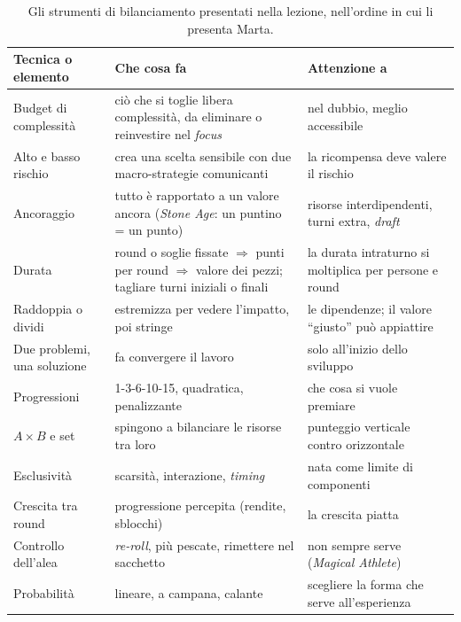 \begin{table}[htbp]
\centering
\small
\begin{tabular}{@{}p{3.2cm}p{5.2cm}p{5.0cm}@{}}
\toprule
\textbf{Tecnica o elemento} & \textbf{Che cosa fa} & \textbf{Attenzione a} \\
\midrule
Budget di complessità & ciò che si toglie libera complessità, da eliminare o reinvestire
  nel \emph{focus} & nel dubbio, meglio accessibile \\
\addlinespace
Alto e basso rischio & crea una scelta sensibile con due macro-strategie comunicanti & la
  ricompensa deve valere il rischio \\
\addlinespace
Ancoraggio & tutto è rapportato a un valore ancora (\emph{Stone Age}: un puntino = un punto)
  & risorse interdipendenti, turni extra, \emph{draft} \\
\addlinespace
Durata & round o soglie fissate $\Rightarrow$ punti per round $\Rightarrow$ valore dei
  pezzi; tagliare turni iniziali o finali & la durata intraturno si moltiplica per persone
  e round \\
\addlinespace
Raddoppia o dividi & estremizza per vedere l'impatto, poi stringe & le dipendenze; il
  valore ``giusto'' può appiattire \\
\addlinespace
Due problemi, una soluzione & fa convergere il lavoro & solo all'inizio dello sviluppo \\
\addlinespace
Progressioni & 1-3-6-10-15, quadratica, penalizzante & che cosa si vuole premiare \\
\addlinespace
$A \times B$ e set & spingono a bilanciare le risorse tra loro & punteggio verticale contro
  orizzontale \\
\addlinespace
Esclusività & scarsità, interazione, \emph{timing} & nata come limite di componenti \\
\addlinespace
Crescita tra round & progressione percepita (rendite, sblocchi) & la crescita piatta \\
\addlinespace
Controllo dell'alea & \emph{re-roll}, più pescate, rimettere nel sacchetto & non sempre serve
  (\emph{Magical Athlete}) \\
\addlinespace
Probabilità & lineare, a campana, calante & scegliere la forma che serve all'esperienza \\
\bottomrule
\end{tabular}
\caption{Gli strumenti di bilanciamento presentati nella lezione, nell'ordine in cui li
presenta Marta.}
\label{a14:tab:elementi}
\end{table}

